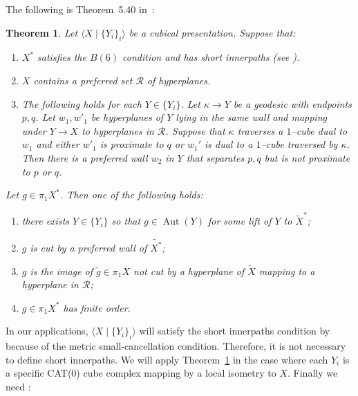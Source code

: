 \documentclass[11pt,oneside]{amsart}
\newtheorem{thm}{Theorem}[section]
\theoremstyle{definition}
\DeclareMathOperator{\Aut}{Aut}
\begin{document}
The following is Theorem~5.40 in~\cite{Wise:QCH}:

\begin{thm}\label{thm:cubulating X star}
Let $\langle X \mid \{Y_i\}_i\rangle$ be a cubical presentation.  Suppose that:
\begin{enumerate}
\item $X^*$ satisfies the $B(6)$ condition and has \emph{short innerpaths} (see \cite[Definition~3.69]{Wise:QCH}).

\item $X$ contains a preferred set $\mathcal R$ of hyperplanes.

\item \label{LS:strong separation}
The following holds for each $Y\in\{Y_i\}$.  Let $\kappa\to Y$ be a geodesic with endpoints $p,q$.  Let $w_1,w'_1$ 
be hyperplanes of $Y$ lying in the same wall and mapping under $Y\to X$ to hyperplanes in $\mathcal R$.  Suppose 
that $\kappa$ traverses a $1$--cube dual to $w_1$ and either $w'_1$ is proximate to $q$ or $w_1'$ is dual to a 
$1$--cube traversed by $\kappa$.  Then there is a preferred wall $w_2$ in $Y$ that separates $p,q$ but is not proximate to $p$ 
or $q$.
\end{enumerate}
Let $g\in\pi_1X^*$.  Then one of the following holds:
\begin{enumerate}
     \item there exists $Y\in\{Y_i\}$ so that $g\in\Aut(Y)$ for some lift of $Y$ to $\widetilde 
X^*$;\label{item:in_aut}
\item $g$ is cut by a preferred wall of $\widetilde{X^*}$;\label{item:preferred_cut}
\item $g$ is the image of $\tilde g\in\pi_1X$ not cut by a hyperplane of $\widetilde X$ mapping to a 
hyperplane in $\mathcal R$;\label{item:not_preferred_cut}
\item $g\in\pi_1X^*$ has finite order.\label{item:torsion}
\end{enumerate}

\end{thm}

In our applications, $\langle X \mid \{Y_i\}_i\rangle$ will satisfy the short innerpaths condition 
by~\cite[Lemma 3.70]{Wise:QCH} because of the metric small-cancellation condition.  Therefore, it is not 
necessary to define short innerpaths.  We will apply Theorem~\ref{thm:cubulating X star} in the case where each $Y_i$ is a specific CAT(0) cube complex mapping by a local isometry to $X$.  Finally we need  \cite[Thm. 5.18]{Wise:QCH}:
\end{document}
